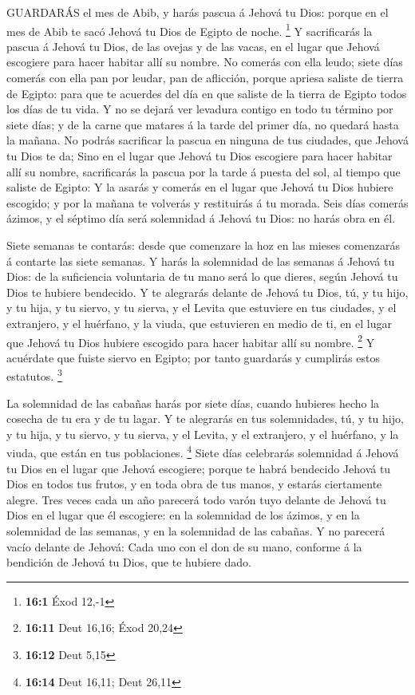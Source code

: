  GUARDARÁS el mes de Abib, y harás pascua á Jehová tu Dios:
porque en el mes de Abib te sacó Jehová tu Dios de Egipto de noche.
\footnote{\textbf{16:1} Éxod 12,-1}  Y sacrificarás la
pascua á Jehová tu Dios, de las ovejas y de las vacas, en el lugar que
Jehová escogiere para hacer habitar allí su nombre.  No
comerás con ella leudo; siete días comerás con ella pan por leudar, pan
de aflicción, porque apriesa saliste de tierra de Egipto: para que te
acuerdes del día en que saliste de la tierra de Egipto todos los días de
tu vida.  Y no se dejará ver levadura contigo en todo tu
término por siete días; y de la carne que matares á la tarde del primer
día, no quedará hasta la mañana.  No podrás sacrificar la
pascua en ninguna de tus ciudades, que Jehová tu Dios te da;
 Sino en el lugar que Jehová tu Dios escogiere para hacer
habitar allí su nombre, sacrificarás la pascua por la tarde á puesta del
sol, al tiempo que saliste de Egipto:  Y la asarás y comerás
en el lugar que Jehová tu Dios hubiere escogido; y por la mañana te
volverás y restituirás á tu morada.  Seis días comerás
ázimos, y el séptimo día será solemnidad á Jehová tu Dios: no harás obra
en él.

 Siete semanas te contarás: desde que comenzare la hoz en
las mieses comenzarás á contarte las siete semanas.  Y
harás la solemnidad de las semanas á Jehová tu Dios: de la suficiencia
voluntaria de tu mano será lo que dieres, según Jehová tu Dios te
hubiere bendecido.  Y te alegrarás delante de Jehová tu
Dios, tú, y tu hijo, y tu hija, y tu siervo, y tu sierva, y el Levita
que estuviere en tus ciudades, y el extranjero, y el huérfano, y la
viuda, que estuvieren en medio de ti, en el lugar que Jehová tu Dios
hubiere escogido para hacer habitar allí su nombre. \footnote{\textbf{16:11}
  Deut 16,16; Éxod 20,24}  Y acuérdate que fuiste siervo en
Egipto; por tanto guardarás y cumplirás estos estatutos. \footnote{\textbf{16:12}
  Deut 5,15}

 La solemnidad de las cabañas harás por siete días, cuando
hubieres hecho la cosecha de tu era y de tu lagar.  Y te
alegrarás en tus solemnidades, tú, y tu hijo, y tu hija, y tu siervo, y
tu sierva, y el Levita, y el extranjero, y el huérfano, y la viuda, que
están en tus poblaciones. \footnote{\textbf{16:14} Deut 16,11; Deut
  26,11}  Siete días celebrarás solemnidad á Jehová tu Dios
en el lugar que Jehová escogiere; porque te habrá bendecido Jehová tu
Dios en todos tus frutos, y en toda obra de tus manos, y estarás
ciertamente alegre.  Tres veces cada un año parecerá todo
varón tuyo delante de Jehová tu Dios en el lugar que él escogiere: en la
solemnidad de los ázimos, y en la solemnidad de las semanas, y en la
solemnidad de las cabañas. Y no parecerá vacío delante de Jehová:
 Cada uno con el don de su mano, conforme á la bendición de
Jehová tu Dios, que te hubiere dado.

